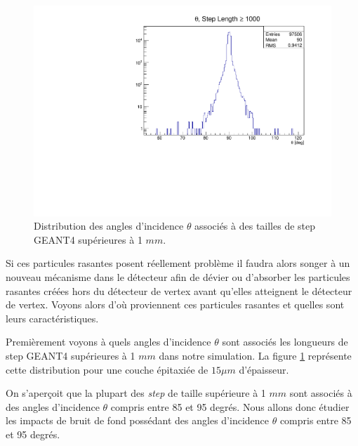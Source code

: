   \begin{figure}[!htb]
    \begin{center}
      \includegraphics[scale=0.55]{./figures/sensors_Readout_Time/theta_stepLength_sup_1000_epi15um_log.pdf}
      \caption{Distribution des angles d'incidence $\theta$ associ\'es \`a des tailles de step GEANT4 sup\'erieures \`a 1 $mm$.}
      \label{fig:theta_for_step_sup_1000}
    \end{center}
  \end{figure}
  
  \medskip
  
  Si ces particules rasantes posent r\'eellement probl\`eme il faudra alors songer \`a un nouveau m\'ecanisme dans le d\'etecteur afin de d\'evier ou d'absorber les particules rasantes cr\'e\'ees hors du d\'etecteur de vertex avant qu'elles atteignent le d\'etecteur de vertex. Voyons alors d'o\`u proviennent ces particules rasantes et quelles sont leurs caract\'eristiques.
  
  \medskip

  Premi\`erement voyons \`a quels angles d'incidence $\theta$ sont associ\'es les longueurs de step GEANT4 sup\'erieures \`a 1 $mm$ dans notre simulation. La figure \ref{fig:theta_for_step_sup_1000} repr\'esente cette distribution pour une couche \'epitaxi\'ee de $15 \mu m$ d'\'epaisseur.
  
  \medskip
  
  On s'aperçoit que la plupart des \textit{step} de taille sup\'erieure \`a 1 $mm$ sont associ\'es \`a des angles d'incidence $\theta$ compris entre 85 et 95 degr\'es. Nous allons donc \'etudier les impacts de bruit de fond poss\'edant des angles d'incidence $\theta$ compris entre 85 et 95 degr\'es.
  
